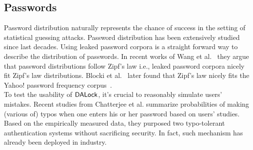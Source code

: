 
\subsection{Passwords} \label{related: Passwords}  
 Password distribution naturally represents the chance of success in the setting of statistical guessing attacks. Password distribution has been extensively studied since last decades\cite{FloHer:WWW07}\cite{DavKev:WWW12}. Using leaked password corpora\cite{Dataset:RockYou}\cite{Dataset:LinkedIn}\cite{SP:Bonneau12} is a straight forward way to describe the distribution of passwords. In recent works of Wang et al.~\cite{EPRINT:WJHW14,TIFS17:WCWPXG,ESORICS:WanWan16} they argue that password distributions follow Zipf's law i.e., leaked password corpora nicely fit Zipf's law distributions. Blocki et al.~\cite{SP:BloHarZho18} later found that Zipf's law nicely fits the Yahoo! password frequency corpus~\cite{SP:Bonneau12,NDSS:BloDatBon16}. \\
  To test the usability of $\mathsf{DALock}$, it's crucial to reasonably simulate users' mistakes. Recent studies\cite{CCS:CWPCR17,SP:CAAJR16} from Chatterjee et al. summarize probabilities of making (various of) typos when one enters his or her password based on users' studies. Based on the empirically measured data, they purposed two typo-tolerant authentication systems without sacrificing security. In fact, such mechanism has already been deployed in industry\cite{News:FacebookCaseSensitiveNews}\cite{News:AmazonTypo}. 

